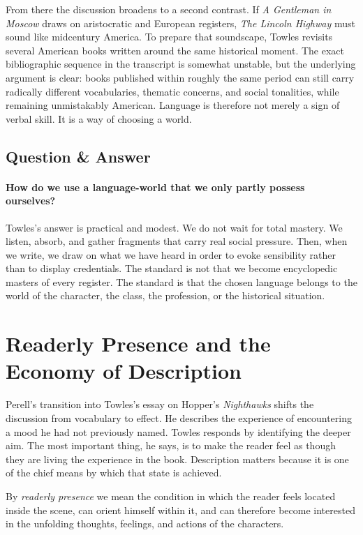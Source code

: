 From there the discussion broadens to a second contrast. If \emph{A Gentleman in Moscow} draws on aristocratic and European registers, \emph{The Lincoln Highway} must sound like midcentury America. To prepare that soundscape, Towles revisits several American books written around the same historical moment. The exact bibliographic sequence in the transcript is somewhat unstable, but the underlying argument is clear: books published within roughly the same period can still carry radically different vocabularies, thematic concerns, and social tonalities, while remaining unmistakably American. Language is therefore not merely a sign of verbal skill. It is a way of choosing a world.

\subsection{Question \& Answer}

\paragraph{How do we use a language-world that we only partly possess ourselves?}

Towles's answer is practical and modest. We do not wait for total mastery. We listen, absorb, and gather fragments that carry real social pressure. Then, when we write, we draw on what we have heard in order to evoke sensibility rather than to display credentials. The standard is not that we become encyclopedic masters of every register. The standard is that the chosen language belongs to the world of the character, the class, the profession, or the historical situation.

\section{Readerly Presence and the Economy of Description}

Perell's transition into Towles's essay on Hopper's \emph{Nighthawks} shifts the discussion from vocabulary to effect. He describes the experience of encountering a mood he had not previously named. Towles responds by identifying the deeper aim. The most important thing, he says, is to make the reader feel as though they are living the experience in the book. Description matters because it is one of the chief means by which that state is achieved.

\begin{definition}
By \emph{readerly presence} we mean the condition in which the reader feels located inside the scene, can orient himself within it, and can therefore become interested in the unfolding thoughts, feelings, and actions of the characters.
\end{definition}

